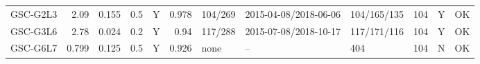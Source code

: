 \begin{longtable}{lrrrcrlllrcc}
GSC-G2L3 & 2.09 & 0.155 & 0.5 & Y & 0.978 & 104/269 & 2015-04-08/2018-06-06 & 104/165/135 & 104 & Y & OK\\
GSC-G3L6 & 2.78 & 0.024 & 0.2 & Y & 0.94 & 117/288 & 2015-07-08/2018-10-17 & 117/171/116 & 104 & Y & OK\\
GSC-G6L7 & 0.799 & 0.125 & 0.5 & Y & 0.926 & none & -- & 404 & 104 & N & OK\\

\end{longtable}
